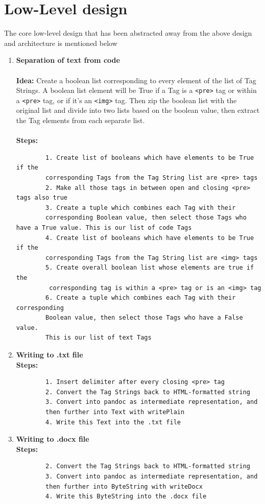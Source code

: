 \documentclass{scrreprt}
\begin{document}
\section{Low-Level design}
The core low-level design that has been abstracted away from the above design and architecture is mentioned below


\begin{enumerate}
    \item \textbf{Separation of text from code} \\ 
    \\ \textbf{Idea:} Create a boolean list corresponding to every element of the list of Tag Strings. A boolean list element will be True if a Tag is a \texttt{<pre>} tag or within a \texttt{<pre>} tag, or if it's an \texttt{<img>} tag. Then zip the boolean list with the original list and divide into two lists based on the boolean value, then extract the Tag elements from each separate list.\\
    \\ \textbf{Steps:}
    \begin{verbatim}
        1. Create list of booleans which have elements to be True if the 
        corresponding Tags from the Tag String list are <pre> tags
        2. Make all those tags in between open and closing <pre> tags also true
        3. Create a tuple which combines each Tag with their 
        corresponding Boolean value, then select those Tags who have a True value. This is our list of code Tags
        4. Create list of booleans which have elements to be True if the 
        corresponding Tags from the Tag String list are <img> tags
        5. Create overall boolean list whose elements are true if the
         corresponding tag is within a <pre> tag or is an <img> tag
        6. Create a tuple which combines each Tag with their corresponding 
        Boolean value, then select those Tags who have a False value. 
        This is our list of text Tags
    \end{verbatim}

    \item \textbf{Writing to .txt file} \\ 
    \textbf{Steps:}
    \begin{verbatim}
        1. Insert delimiter after every closing <pre> tag
        2. Convert the Tag Strings back to HTML-formatted string
        3. Convert into pandoc as intermediate representation, and 
        then further into Text with writePlain
        4. Write this Text into the .txt file
    \end{verbatim} 

    \item \textbf{Writing to .docx file} \\ 
    \textbf{Steps:}
    \begin{verbatim}
        2. Convert the Tag Strings back to HTML-formatted string
        3. Convert into pandoc as intermediate representation, and 
        then further into ByteString with writeDocx
        4. Write this ByteString into the .docx file
    \end{verbatim} 
    
    
\end{enumerate}
\end{document}
